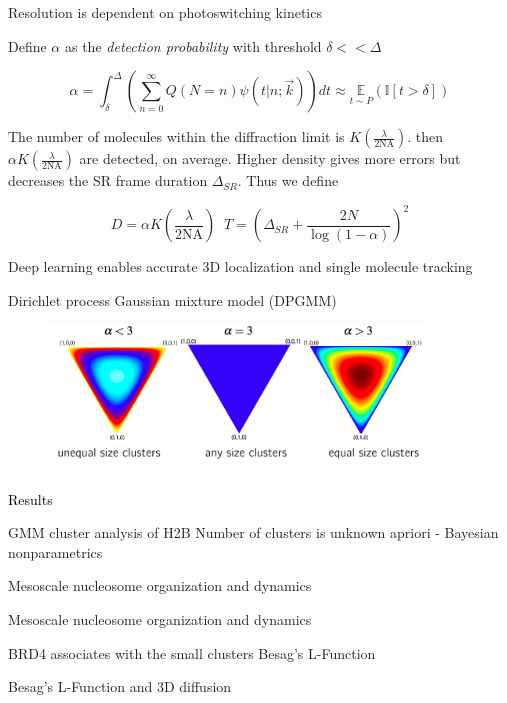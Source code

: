 \documentclass{beamer}					%
\begin{document}
\begin{frame}{Resolution is dependent on photoswitching kinetics}

Define $\alpha$ as the \emph{detection probability} with threshold $\delta << \Delta$

\begin{equation*}
\alpha = \int_{\delta}^{\Delta}\left(\sum_{n=0}^{\infty}Q(N=n)\psi(t|n;\vec{k})\right)dt \approx \underset{t\sim P}{\mathbb{E}}\left(\mathbb{I}[t > \delta]\right)
\end{equation*}

The number of molecules within the diffraction limit is $K\left(\frac{\lambda}{2\mathrm{NA}}\right)$. then $\alpha K\left(\frac{\lambda}{2\mathrm{NA}}\right)$ are detected, on average. Higher density gives more errors but decreases the SR frame duration $\Delta_{SR}$. Thus we define

\begin{equation*}
D = \alpha K\left(\frac{\lambda}{2\mathrm{NA}}\right)\;\; T = \left(\Delta_{SR}+\frac{2N}{\log(1-\alpha)}\right)^{2}
\end{equation*}

\end{frame}

\begin{frame}{Deep learning enables accurate 3D localization and single molecule tracking}

\end{frame}


\begin{frame}{Dirichlet process Gaussian mixture model (DPGMM)}
\begin{figure}
\includegraphics[width=10cm]{Dirichlet.png}
\end{figure}
\end{frame}

\begin{frame}
\frametitle{}
\centering
\Large \textcolor{black}{Results}
\end{frame}


\begin{frame}{GMM cluster analysis of H2B}
Number of clusters is unknown apriori - Bayesian nonparametrics
\end{frame}

\begin{frame}{Mesoscale nucleosome organization and dynamics}
\end{frame}

\begin{frame}{Mesoscale nucleosome organization and dynamics}
\end{frame}

\begin{frame}{BRD4 associates with the small clusters}
Besag's L-Function
\end{frame}

\begin{frame}{Besag's L-Function and 3D diffusion}
\end{frame}
\end{document}
